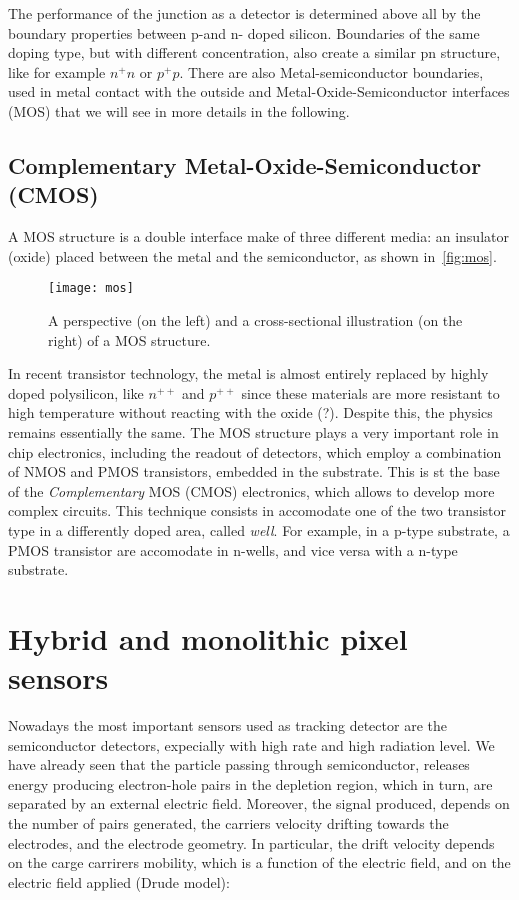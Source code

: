 The performance of the junction as a detector is determined above all by the boundary properties between p-and n- doped silicon. Boundaries of the same doping type, but with different concentration, also create a similar pn structure, like for example $n^{+}n$ or $p^{+}p$. There are also Metal-semiconductor boundaries, used in metal contact with the outside and Metal-Oxide-Semiconductor interfaces (MOS) that we will see in more details in the following.
 
 
\subsection{Complementary Metal-Oxide-Semiconductor (CMOS)}

A MOS structure is a double interface make of three different media: an insulator (oxide) placed between the metal and the semiconductor, as shown in~\autoref{fig:mos}.

\begin{figure}[h!]
\centering
\texttt{[image: mos]}
\caption{A perspective (on the left) and a cross-sectional illustration (on the right) of a MOS structure.}
\label{fig:mos}
\end{figure}

In recent transistor technology, the metal is almost entirely replaced by highly doped polysilicon, like $n^{++}$ and $p^{++}$ since these materials are more resistant to high temperature without reacting with the oxide (?). Despite this, the physics remains essentially the same. 
The MOS structure plays a very important role in chip electronics, including the readout of detectors, which employ a combination of NMOS and PMOS transistors, embedded in the substrate. This is st the base of the \emph{Complementary} MOS (CMOS) electronics, which allows to develop more complex circuits. This technique consists in accomodate one of the two transistor type in a differently doped area, called \emph{well}. For example,  in a p-type substrate, a PMOS transistor are accomodate in n-wells, and vice versa with a n-type substrate. 


\section{Hybrid and monolithic pixel sensors}

Nowadays the most important sensors used as tracking detector are the semiconductor detectors, expecially with high rate and high radiation level. We have already seen that the particle passing through semiconductor, releases energy producing electron-hole pairs in the depletion region, which in turn, are separated by an external electric field. Moreover, the signal produced, depends on the number of pairs generated, the carriers velocity drifting towards the electrodes, and the electrode geometry. 
In particular, the drift velocity depends on the carge carrirers mobility, which is a function of the electric field, and on the electric field applied (Drude model):

